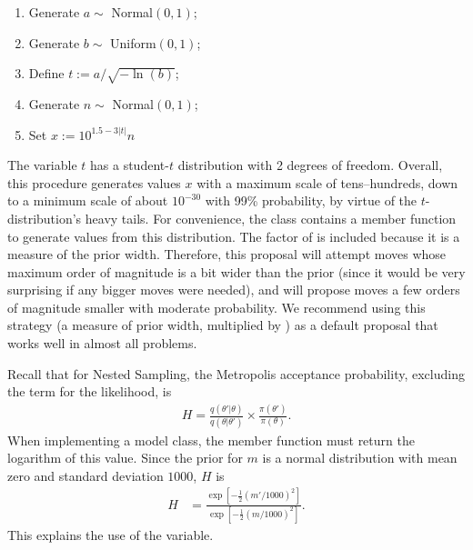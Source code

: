 \documentclass[article, nojss]{jss}
\newcommand{\params}{\theta}
\begin{document}
\begin{enumerate}
\item Generate $a \sim$ Normal$(0, 1)$;
\item Generate $b \sim$ Uniform$(0, 1)$;
\item Define $t := a/\sqrt{-\ln(b)}$;
\item Generate $n \sim$ Normal$(0, 1)$;
\item Set $x := 10^{1.5 - 3|t|}n$
\end{enumerate}
The variable $t$ has a student-$t$ distribution with 2 degrees of freedom.
Overall, this procedure generates values $x$
with a maximum scale of tens--hundreds, down to
a minimum scale of about $10^{-30}$ with 99\% probability, by virtue
of the $t$-distribution's heavy tails.
For convenience, the  class contains a member function 
to generate values from this distribution.
The factor of  is included because it is a measure of the prior
width. Therefore, this proposal will attempt moves whose maximum order of
magnitude is a bit wider than the prior (since it would be very surprising
if any bigger moves were needed), and will propose moves a few orders of
magnitude smaller with moderate probability. We recommend using
this strategy (a measure of prior width, multiplied by ) as
a default proposal that works well in almost all problems.

Recall that for Nested Sampling, the Metropolis acceptance probability,
excluding the term for the likelihood, is
\begin{align}
H = \frac{q(\params'|\params)}{q(\params | \params')}
\times \frac{\pi(\params')}{\pi(\params)}.
\end{align}
When implementing a model class, the
member function must return the logarithm of this value.
Since the prior for $m$ is a normal distribution with
mean zero and standard deviation $1000$, $H$ is
\begin{align}
H &= \frac{\exp\left[-\frac{1}{2}(m'/1000)^2\right]}
{\exp\left[-\frac{1}{2}(m/1000)^2\right]}.
\end{align}
This explains the use of the  variable.
\end{document}
